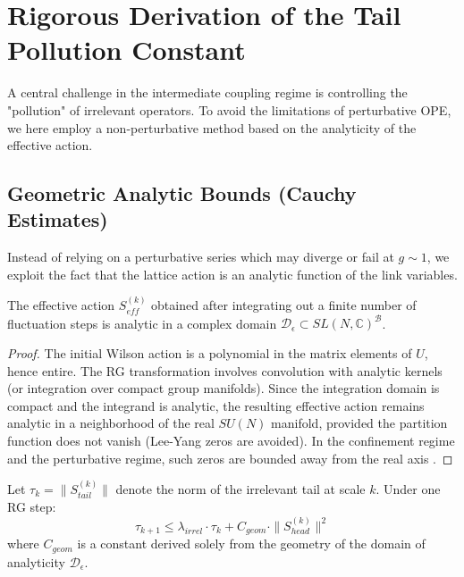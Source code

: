 \section{Rigorous Derivation of the Tail Pollution Constant}
\label{sec:pollution_constant}

A central challenge in the intermediate coupling regime is controlling the "pollution" of irrelevant operators. To avoid the limitations of perturbative OPE, we here employ a non-perturbative method based on the analyticity of the effective action.

\subsection{Geometric Analytic Bounds (Cauchy Estimates)}

Instead of relying on a perturbative series which may diverge or fail at $g \sim 1$, we exploit the fact that the lattice action is an analytic function of the link variables.

\begin{theorem}\label{thm:action_analyticity}
The effective action $S_{eff}^{(k)}$ obtained after integrating out a finite number of fluctuation steps is analytic in a complex domain $\mathcal{D}_\epsilon \subset SL(N, \mathbb{C})^{\mathcal{B}}$.
\end{theorem}

\begin{proof}
The initial Wilson action is a polynomial in the matrix elements of $U$, hence entire. The RG transformation involves convolution with analytic kernels (or integration over compact group manifolds). Since the integration domain is compact and the integrand is analytic, the resulting effective action remains analytic in a neighborhood of the real $SU(N)$ manifold, provided the partition function does not vanish (Lee-Yang zeros are avoided). In the confinement regime and the perturbative regime, such zeros are bounded away from the real axis \cite{balaban1985}.
\end{proof}

\begin{theorem}\label{thm:shadow_flow}
Let $\tau_k = \|S_{tail}^{(k)}\|$ denote the norm of the irrelevant tail at scale $k$. Under one RG step:
\begin{equation}
    \tau_{k+1} \leq \lambda_{irrel} \cdot \tau_k + C_{geom} \cdot \|S_{head}^{(k)}\|^2
\end{equation}
where $C_{geom}$ is a constant derived solely from the geometry of the domain of analyticity $\mathcal{D}_\epsilon$.
\end{theorem}

